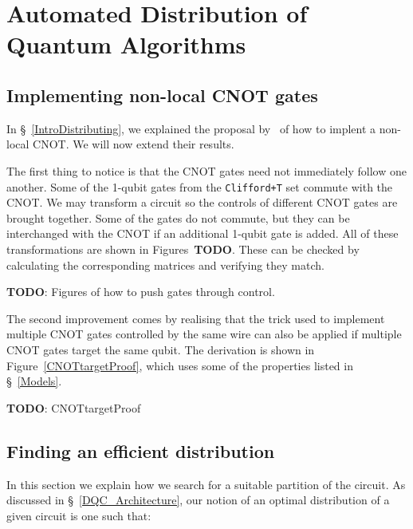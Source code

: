 \chapter{Automated Distribution of Quantum Algorithms}
\label{chap:Project}

\section{Implementing non-local CNOT gates}
\label{NonLocalGates}

In \S~\ref{IntroDistributing}, we explained the proposal by~\citet{NonLocalCNOT} of how to implent a non-local CNOT. We will now extend their results.

The first thing to notice is that the CNOT gates need not immediately follow one another. Some of the 1-qubit gates from the \texttt{Clifford+T} set commute with the CNOT. We may transform a circuit so the controls of different CNOT gates are brought together. Some of the gates do not commute, but they can be interchanged with the CNOT if an additional 1-qubit gate is added. All of these transformations are shown in Figures~\textbf{TODO}. These can be checked by calculating the corresponding matrices and verifying they match.

\textbf{TODO}: Figures of how to push gates through control.

The second improvement comes by realising that the trick used to implement multiple CNOT gates controlled by the same wire can also be applied if multiple CNOT gates target the same qubit. The derivation is shown in Figure~\ref{CNOTtargetProof}, which uses some of the properties listed in \S~\ref{Models}.

\textbf{TODO}: CNOTtargetProof


\section{Finding an efficient distribution}
\label{EfficientDistrib}

In this section we explain how we search for a suitable partition of the circuit. As discussed in \S~\ref{DQC_Architecture}, our notion of an optimal distribution of a given circuit is one such that:

